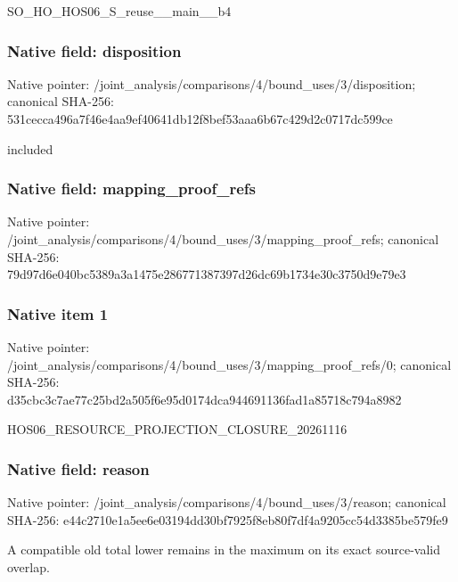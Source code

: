 \documentclass[10pt,a4paper]{article}
\begin{document}
\begingroup\raggedright\sloppy SO\_\allowbreak{}HO\_\allowbreak{}HOS06\_\allowbreak{}S\_\allowbreak{}reuse\_\allowbreak{}\_\allowbreak{}main\_\allowbreak{}\_\allowbreak{}b4\par\endgroup

\subsubsection{Native field: disposition}
Native pointer: /joint\_\allowbreak{}analysis/comparisons/4/bound\_\allowbreak{}uses/3/disposition; canonical SHA-256: 531cecca496a7f46e4aa9ef40641db12f8bef53aaa6b67c429d2c0717dc599ce

\begingroup\raggedright\sloppy included\par\endgroup

\subsubsection{Native field: mapping\_\allowbreak{}proof\_\allowbreak{}refs}
Native pointer: /joint\_\allowbreak{}analysis/comparisons/4/bound\_\allowbreak{}uses/3/mapping\_\allowbreak{}proof\_\allowbreak{}refs; canonical SHA-256: 79d97d6e040bc5389a3a1475e286771387397d26dc69b1734e30c3750d9e79e3

\subsubsection{Native item 1}
Native pointer: /joint\_\allowbreak{}analysis/comparisons/4/bound\_\allowbreak{}uses/3/mapping\_\allowbreak{}proof\_\allowbreak{}refs/0; canonical SHA-256: d35cbc3c7ae77c25bd2a505f6e95d0174dca944691136fad1a85718c794a8982

\begingroup\raggedright\sloppy HOS06\_\allowbreak{}RESOURCE\_\allowbreak{}PROJECTION\_\allowbreak{}CLOSURE\_\allowbreak{}20261116\par\endgroup

\subsubsection{Native field: reason}
Native pointer: /joint\_\allowbreak{}analysis/comparisons/4/bound\_\allowbreak{}uses/3/reason; canonical SHA-256: e44c2710e1a5ee6e03194dd30bf7925f8eb80f7df4a9205cc54d3385be579fe9

\begingroup\raggedright\sloppy A compatible old total lower remains in the maximum on its exact source-valid overlap.\par\endgroup
\end{document}
